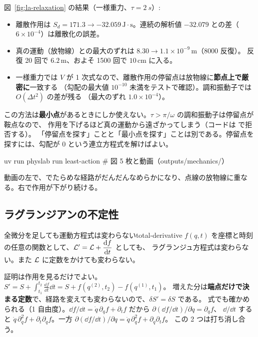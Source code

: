 図~\ref{fig:la-relaxation} の結果（一様重力、$\tau=\qty{2}{s}$）:
\begin{itemize}
  \item 離散作用は $S_d=171.3\to-32.059\,\mathrm{J{\cdot}s}$。連続の解析値 $-32.079$ との差（$6\times10^{-4}$）は離散化の誤差。
  \item 真の運動（放物線）との最大のずれは $8.30\to1.1\times10^{-9}\,\mathrm{m}$（8000 反復）。
    反復 20 回で $6.2\,\mathrm{m}$、およそ 1500 回で $10\,\mathrm{cm}$ に入る。
  \item 一様重力では $V$ が 1 次式なので、離散作用の停留点は放物線に\textbf{節点上で厳密に}一致する
    （勾配の最大値 $10^{-10}$ 未満をテストで確認）。調和振動子では $O(\Delta t^2)$ の差が残る
    （最大のずれ $1.0\times10^{-4}$）。
\end{itemize}

\begin{note}
この方法は\textbf{最小点}があるときにしか使えない。$\tau>\pi/\omega$ の調和振動子は停留点が鞍点なので、
作用を下げるほど真の運動から遠ざかってしまう（コードは  で拒否する）。
「停留点を探す」ことと「最小点を探す」ことは別である。停留点を探すには、勾配が 0 という連立方程式を解けばよい。
\end{note}

\begin{simbox}
\begin{terminal}
uv run physlab run least-action      # 図 5 枚と動画（outputs/mechanics/）
\end{terminal}
動画の左で、でたらめな経路がだんだんなめらかになり、点線の放物線に重なる。右で作用が下がり続ける。
\end{simbox}

\subsection{ラグランジアンの不定性}\label{sec:lagr-ambiguity}

\begin{result}{全微分を足しても運動方程式は変わらない}{total-derivative}
$f(q,t)$ を座標と時刻の任意の関数として、$\mathcal{L}'=\mathcal{L}+\dfrac{\mathrm{d} f}{\mathrm{d} t}$ としても、
ラグランジュ方程式は変わらない。また $\mathcal{L}$ に定数をかけても変わらない。
\end{result}

証明は作用を見るだけでよい。$S'=S+\displaystyle\int_{t_1}^{t_2}\frac{\dd f}{\dd t}\dd t=S+f(q^{(2)},t_2)-f(q^{(1)},t_1)$。
増えた分は\textbf{端点だけで決まる定数}で、経路を変えても変わらないので、$\delta S'=\delta S$ である。
式でも確かめられる（1 自由度）。$\dd f/\dd t=\dot q\,\partial_qf+\partial_tf$ だから
$\partial(\dd f/\dd t)/\partial\dot q=\partial_qf$、
$\dd/\dd t$ すると $\dot q\,\partial_q^2f+\partial_t\partial_qf$。一方 $\partial(\dd f/\dd t)/\partial q=\dot q\,\partial_q^2f+\partial_q\partial_tf$。
この 2 つは打ち消し合う。


